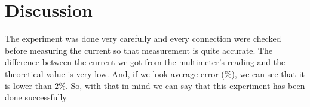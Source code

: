 \documentclass[a4paper,12pt]{article}
\begin{document}
\section*{Discussion}
The experiment was done very carefully and every connection were checked before measuring the current so that measurement is quite accurate. The difference between the current we got from the multimeter's reading and the theoretical value is very low. And, if we look average error (\%), we can see that it is lower than $2\%$. So, with that in mind we can say that this experiment has been done successfully.
\end{document}
